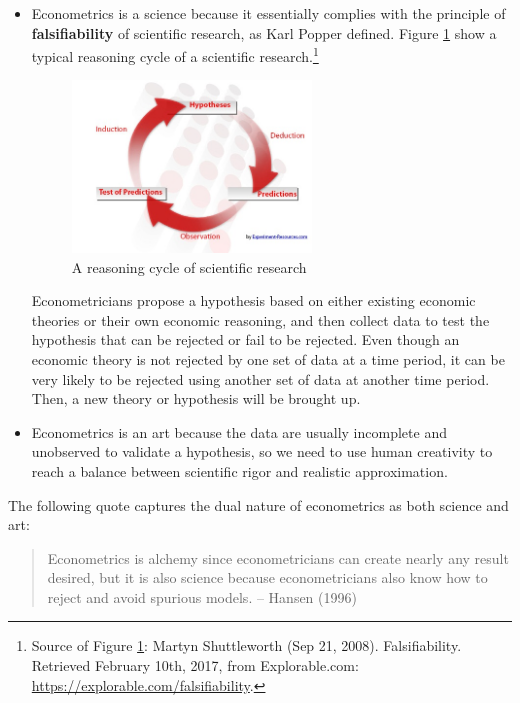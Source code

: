 \documentclass[a4paper,11pt]{article}
\begin{document}
\begin{itemize}
\item Econometrics is a science because it essentially complies with the
principle of \textbf{falsifiability} of scientific research, as Karl Popper
defined. Figure \ref{fig:org1b84c2c} show a typical reasoning cycle
of a scientific research.\footnote{Source of Figure \ref{fig:org1b84c2c}: Martyn Shuttleworth (Sep
21, 2008). Falsifiability. Retrieved February 10th, 2017, from Explorable.com:
\url{https://explorable.com/falsifiability}.}

\begin{figure}[htbp]
\centering
\includegraphics[width=0.6\textwidth]{figure/reasoning-cycle-research.jpg}
\caption{\label{fig:org1b84c2c}
A reasoning cycle of scientific research}
\end{figure}

Econometricians propose a hypothesis based on either existing economic
theories or their own economic reasoning, and then collect data to
test the hypothesis that can be rejected or fail to be rejected. Even
though an economic theory is not rejected by one set of data at a
time period, it can be very likely to be rejected using another set of
data at another time period. Then, a new theory or hypothesis will
be brought up.

\item Econometrics is an art because the data are usually incomplete and
unobserved to validate a hypothesis, so we need to use human
creativity to reach a balance between scientific rigor and realistic
approximation.
\end{itemize}

The following quote captures the dual nature of econometrics as both
science and art:
\begin{quote}
Econometrics is alchemy since econometricians can create nearly any
result desired, but it is also science because econometricians also
know how to reject and avoid spurious models. -- Hansen (1996)
\end{quote}
\end{document}
